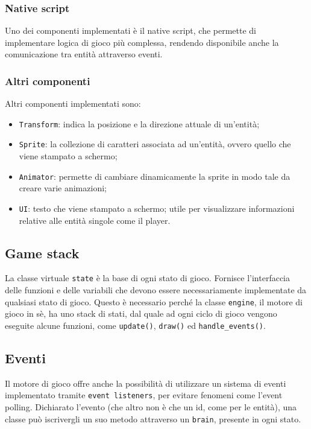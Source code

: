 \documentclass{article}
\begin{document}
\subsubsection{Native script}

Uno dei componenti implementati è il native script, che permette di implementare logica di gioco più complessa, rendendo disponibile anche la comunicazione tra entità attraverso eventi.

\subsubsection{Altri componenti}

Altri componenti implementati sono:
\begin{itemize}
    \item \verb|Transform|: indica la posizione e la direzione attuale di un'entità;
    \item \verb|Sprite|: la collezione di caratteri associata ad un'entità, ovvero quello che viene stampato a schermo;
    \item \verb|Animator|: permette di cambiare dinamicamente la sprite in modo tale da creare varie animazioni;
    \item \verb|UI|: testo che viene stampato a schermo; utile per visualizzare informazioni relative alle entità singole come il player.
\end{itemize}

\subsection{Game stack}

La classe virtuale \verb|state| è la base di ogni stato di gioco. Fornisce l'interfaccia delle funzioni e delle variabili che devono essere necessariamente implementate da qualsiasi stato di gioco. Questo è necessario perché la classe \verb|engine|, il motore di gioco in sè, ha uno stack di stati, dal quale ad ogni ciclo di gioco vengono eseguite alcune funzioni, come \verb|update()|, \verb|draw()| ed \verb|handle_events()|.

\subsection{Eventi}

Il motore di gioco offre anche la possibilità di utilizzare un sistema di eventi implementato tramite \verb|event listeners|, per evitare fenomeni come l'event polling. Dichiarato l'evento (che altro non è che un id, come per le entità), una classe può iscrivergli un suo metodo attraverso un \verb|brain|, presente in ogni stato.
\end{document}
